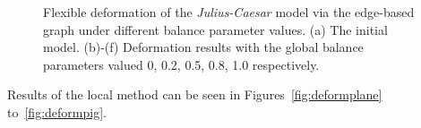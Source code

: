 \begin{figure} [htbp]
{\begin{minipage}[b]{0.32\textwidth}
    \end{minipage}}
  \caption{Flexible deformation of the \textit{Julius-Caesar} model via the edge-based graph under different balance parameter values. (a) The initial model. (b)-(f) Deformation results with the global balance parameters valued 0, 0.2, 0.5, 0.8, 1.0 respectively. }
  \label{fig:deformJCglb} %
\end{figure}


Results of the local method can be seen in Figures~\ref{fig:deformplane} to~\ref{fig:deformpig}.

\begin{figure} [htbp]
  \centering
  \\
  \subfigure[]{
    \centering
    \label{fig:deformplane:c}
    \begin{minipage}[b]{0.32\textwidth}

\end{minipage}}
\end{figure}
